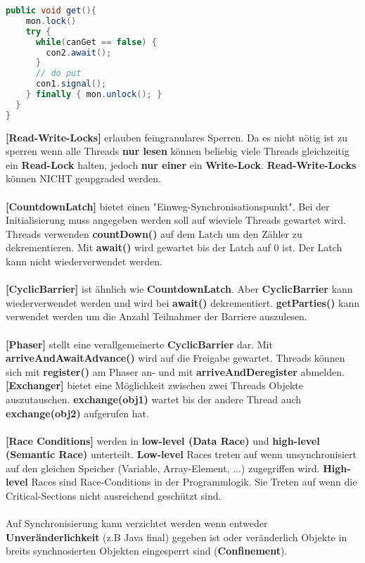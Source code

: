 \documentclass[8pt]{extarticle}
\let\oldtextbf\textbf
\renewcommand{\textbf}{\tiny\oldtextbf}
\begin{document}
\begin{multicols*}{5}
\begin{lstlisting}[language=java]
  public void get(){
    mon.lock()
    try {
      while(canGet == false) {
        con2.await();
      }
      // do put
      con1.signal();
    } finally { mon.unlock(); }
  }
}
\end{lstlisting}
\textbf{[Read-Write-Locks]} erlauben feingranulares Sperren. Da es nicht nötig ist zu sperren wenn alle Threads \textbf{nur lesen} können beliebig viele Threads gleichzeitig ein \textbf{Read-Lock} halten, jedoch \textbf{nur einer} ein \textbf{Write-Lock}. \textbf{Read-Write-Locks} können NICHT geupgraded werden.\\\\
\textbf{[CountdownLatch]} bietet einen "Einweg-Synchronisationspunkt". Bei der Initialisierung muss angegeben werden soll auf wieviele Threads gewartet wird. Threads verwenden \textbf{countDown()} auf dem Latch um den Zähler zu dekrementieren. Mit \textbf{await()} wird gewartet bis der Latch auf 0 ist. Der Latch kann nicht wiederverwendet werden.\\\\
\textbf{[CyclicBarrier]} ist ähnlich wie \textbf{CountdownLatch}. Aber \textbf{CyclicBarrier} kann wiederverwendet werden und wird bei \textbf{await()} dekrementiert. \textbf{getParties()} kann verwendet werden um die Anzahl Teilnahmer der Barriere auszulesen.\\\\
\textbf{[Phaser]} stellt eine verallgemeinerte \textbf{CyclicBarrier} dar. Mit \textbf{arriveAndAwaitAdvance()} wird auf die Freigabe gewartet. Threads können sich mit \textbf{register()} am Phaser an- und mit \textbf{arriveAndDeregister} abmelden.\\
\textbf{[Exchanger]} bietet eine Möglichkeit zwischen zwei Threads Objekte auszutauschen. \textbf{exchange(obj1)} wartet bis der andere Thread auch \textbf{exchange(obj2)} aufgerufen hat.\\\\
\textbf{[Race Conditions]} werden in \textbf{low-level (Data Race)} und \textbf{high-level (Semantic Race)} unterteilt. \textbf{Low-level} Races treten auf wenn unsynchronisiert auf den gleichen Speicher (Variable, Array-Element, ...) zugegriffen wird. \textbf{High-level} Races sind Race-Conditions in der Programmlogik. Sie Treten auf wenn die Critical-Sections nicht ausreichend geschützt sind.\\\\
Auf Synchronisierung kann verzichtet werden wenn entweder \textbf{Unveränderlichkeit} (z.B Java final) gegeben ist oder veränderlich Objekte in breits synchnosierten Objekten eingesperrt sind (\textbf{Confinement}).\\\\

\end{multicols*}
\end{document}
